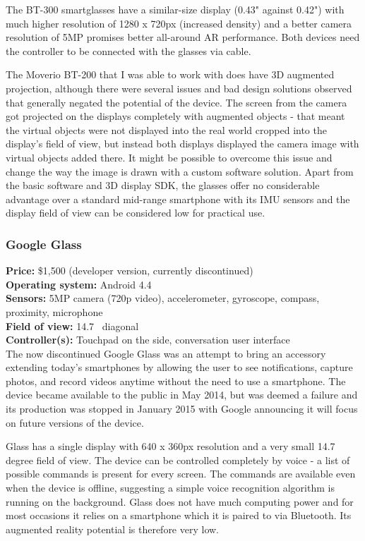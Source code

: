 \documentclass[12pt, a4paper]{article}
\begin{document}
The BT-300 smartglasses have a similar-size display (0.43" against 0.42") with much higher resolution of 1280 x 720px (increased density) and a better camera resolution of 5MP promises better all-around AR performance. Both devices need the controller to be connected with the glasses via cable.

The Moverio BT-200 that I was able to work with does have 3D augmented projection, although there were several issues and bad design solutions observed that generally negated the potential of the device. The screen from the camera got projected on the displays completely with augmented objects - that meant the virtual objects were not displayed into the real world cropped into the display’s field of view, but instead both displays displayed the camera image with virtual objects added there. It might be possible to overcome this issue and change the way the image is drawn with a custom software solution. Apart from the basic software and 3D display SDK, the glasses offer no considerable advantage over a standard mid-range smartphone with its IMU sensors and the display field of view can be considered low for practical use.


\subsubsection{Google Glass}
\vspace*{-5mm}
\textbf{Price:} \$1,500 (developer version, currently discontinued)\\
\textbf{Operating system:} Android 4.4\\
\textbf{Sensors:} 5MP camera (720p video), accelerometer, gyroscope, compass, proximity, microphone\\
\textbf{Field of view:} 14.7\degree~ diagonal\\
\textbf{Controller(s):} Touchpad on the side, conversation user interface \bigskip \\
The now discontinued Google Glass was an attempt to bring an accessory extending today’s smartphones by allowing the user to see notifications, capture photos, and record videos anytime without the need to use a smartphone. The device became available to the public in May 2014, but was deemed a failure and its production was stopped in January 2015 with Google announcing it will focus on future versions of the device.

Glass has a single display with 640 x 360px resolution and a very small 14.7 degree field of view. The device can be controlled completely by voice - a list of possible commands is present for every screen. The commands are available even when the device is offline, suggesting a simple voice recognition algorithm is running on the background. Glass does not have much computing power and for most occasions it relies on a smartphone which it is paired to via Bluetooth. Its augmented reality potential is therefore very low.
\end{document}
